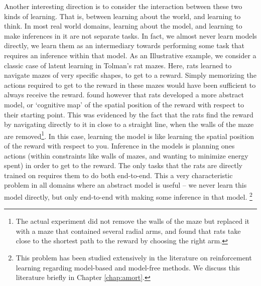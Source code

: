 
Another interesting direction is to consider the interaction between these two kinds of learning. That is, between learning about the world, and learning to think. In most real world domains, learning about the model, and learning to make inferences in it are not separate tasks. In fact, we almost never learn models directly, we learn them as an intermediary towards performing some task that requires an inference within that model. As an Illustrative example, we consider a classic case of latent learning in Tolman's rat mazes\citep{tolman1948cognitive}. Here, rats learned to navigate mazes of very specific shapes, to get to a reward. Simply memorizing the actions required to get to the reward in these mazes would have been sufficient to always receive the reward. \citet{tolman1948cognitive} found however that rats developed a more abstract model, or `cognitive map' of the spatial position of the reward with respect to their starting point. This was evidenced by the fact that the rats find the reward by navigating directly to it in close to a straight line, when the walls of the maze are removed\footnote{The actual experiment did not remove the walls of the maze but replaced it with a maze that contained several radial arms, and found that rats take close to the shortest path to the reward by choosing the right arm.}. In this case, learning the model is like learning the spatial position of the reward with respect to you. Inference in the models is planning ones actions (within constraints like walls of mazes, and wanting to minimize energy spent) in order to get to the reward. The only tasks that the rats are directly trained on requires them to do both end-to-end. This a very characteristic problem in all domains where an abstract model is useful -- we never learn this model directly, but only end-to-end with making some inference in that model. \footnote{This problem has been studied extensively in the literature on reinforcement learning regarding model-based and model-free methods. We discuss this literature briefly in Chapter \ref{chap:amort}.} 


